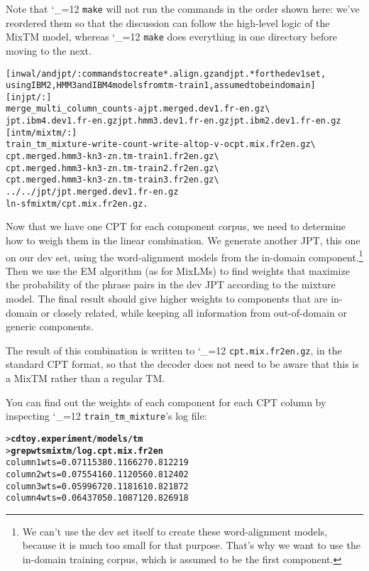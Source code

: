 \documentclass[11pt,letterpaper]{article}
\newcommand{\bs}{\textbackslash{}}
\def\code{\begingroup\catcode`\_=12 \codex}
\newcommand{\codex}[1]{\texttt{#1}\endgroup}
\begin{document}
Note that \code{make} will not run the commands in the order shown here: we've
reordered them so that the discussion can follow the high-level logic of the MixTM
model, whereas \code{make} does everything in one directory before moving
to the next.

\begin{small}
\begin{alltt}
   [in wal/ and jpt/: commands to create *.align.gz and jpt.* for the dev1 set,
    using IBM2, HMM3 and IBM4 models from tm-train1, assumed to be in domain]
   [in jpt/:]
   merge_multi_column_counts -a jpt.merged.dev1.fr-en.gz \bs
      jpt.ibm4.dev1.fr-en.gz jpt.hmm3.dev1.fr-en.gz jpt.ibm2.dev1.fr-en.gz
   [in tm/mixtm/:]
   train_tm_mixture -write-count -write-al top -v -o cpt.mix.fr2en.gz \bs
      cpt.merged.hmm3-kn3-zn.tm-train1.fr2en.gz \bs
      cpt.merged.hmm3-kn3-zn.tm-train2.fr2en.gz \bs
      cpt.merged.hmm3-kn3-zn.tm-train3.fr2en.gz \bs
      ../../jpt/jpt.merged.dev1.fr-en.gz
   ln -sf mixtm/cpt.mix.fr2en.gz .
\end{alltt}
\end{small}

Now that we have one CPT for each component corpus, we need to determine how to
weigh them in the linear combination.  We generate another JPT, this one on our
dev set, using the word-alignment models from the in-domain
component.\footnote{We can't use the dev set itself to create these
word-alignment models, because it is much too small for that purpose.  That's
why we want to use the in-domain training corpus, which is assumed to be the
first component.}  Then we use the EM
algorithm (as for MixLMs) to find weights that maximize the probability of the
phrase pairs in the dev JPT according to the mixture model.  The final result
should give higher weights to components that are in-domain or closely related,
while keeping all information from out-of-domain or generic components.

The result of this combination is written to \code{cpt.mix.fr2en.gz}, in
the standard CPT format, so that the decoder does not need to be aware that
this is a MixTM rather than a regular TM.

You can find out the weights of each component for each CPT column by
inspecting \code{train_tm_mixture}'s log file:
\begin{small}
\begin{alltt}
   > \textbf{cd toy.experiment/models/tm}
   > \textbf{grep wts mixtm/log.cpt.mix.fr2en}
   column 1 wts = 0.0711538 0.116627 0.812219
   column 2 wts = 0.0755416 0.112056 0.812402
   column 3 wts = 0.0599672 0.118161 0.821872
   column 4 wts = 0.0643705 0.108712 0.826918
\end{alltt}
\end{small}
\end{document}
